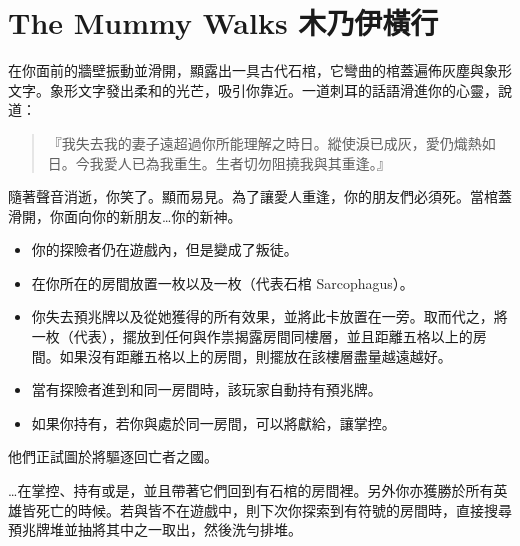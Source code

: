 
\chapter{The Mummy Walks 木乃伊橫行}

\begin{HauntStory}
  在你面前的牆壁振動並滑開，顯露出一具古代石棺，它彎曲的棺蓋遍佈灰塵與象形文字。象形文字發出柔和的光芒，吸引你靠近。一道刺耳的話語滑進你的心靈，說道：
  \begin{quote}
    『我失去我的妻子遠超過你所能理解之時日。縱使淚已成灰，愛仍熾熱如日。今我愛人已為我重生。生者切勿阻撓我與其重逢。』
  \end{quote}
  隨著聲音消逝，你笑了。顯而易見。為了讓愛人重逢，你的朋友們必須死。當棺蓋滑開，你面向你的新朋友…你的新神。
\end{HauntStory}

\vspace*{-1em}
\begin{itemize}
  \item 你的探險者仍在遊戲內，但是變成了叛徒。
  \item 在你所在的房間放置一枚以及一枚（代表石棺 Sarcophagus）。
  \item 你失去預兆牌以及從她獲得的所有效果，並將此卡放置在一旁。取而代之，將一枚（代表），擺放到任何與作祟揭露房間同樓層，並且距離五格以上的房間。如果沒有距離五格以上的房間，則擺放在該樓層盡量越遠越好。
  \item 當有探險者進到和同一房間時，該玩家自動持有預兆牌。
  \item 如果你持有，若你與處於同一房間，可以將獻給，讓掌控。
\end{itemize}

他們正試圖於將驅逐回亡者之國。

…在掌控、持有或是，並且帶著它們回到有石棺的房間裡。另外你亦獲勝於所有英雄皆死亡的時候。若與皆不在遊戲中，則下次你探索到有\OmenSymbol{}符號的房間時，直接搜尋預兆牌堆並抽將其中之一取出，然後洗勻排堆。

\vfill\null\pagebreak


